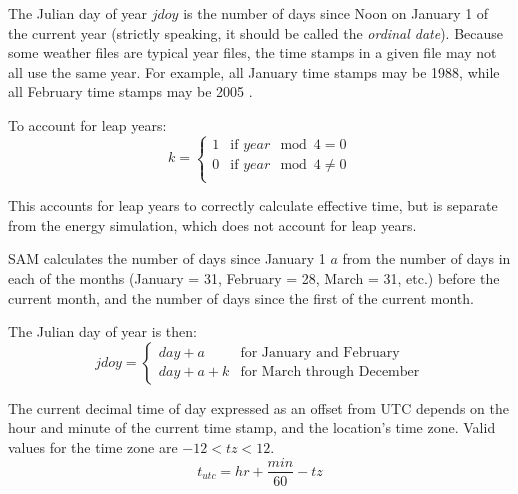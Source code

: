\documentclass[12pt,letterpaper]{article}
\begin{document}
The Julian day of year $\mathit{jdoy}$ is the number of days since Noon on January 1 of the current year (strictly speaking, it should be called the \textit{ordinal date}). Because some weather files are typical year files, the time stamps in a given file may not all use the same year. For example, all January time stamps may be 1988, while all February time stamps may be 2005 \citep{tmy3}.

To account for leap years:
\begin{equation}
k = 
\left\{
   \begin{array}{ll}
      1 & \text{if $\mathit{year}\mod4=0$}\\
      0 & \text{if $\mathit{year}\mod4\neq0$}\\
   \end{array}
\right. 
\end{equation}

This accounts for leap years to correctly calculate effective time, but is separate from the energy simulation, which does not account for leap years.

SAM calculates the number of days since January 1 $a$ from the number of days in each of the months (January = 31, February = 28, March = 31, etc.) before the current month, and the number of days since the first of the current month.

The Julian day of year is then:
\begin{equation}
\mathit{jdoy}= 
\left\{
   \begin{array}{ll}
      \mathit{day} + a & \text{for January and February}\\
      \mathit{day} + a + k & \text{for March through December}
   \end{array}
\right. 
\end{equation}

The current decimal time of day expressed as an offset from UTC depends on the hour and minute of the current time stamp, and the location's time zone. Valid values for the time zone are $-12<\mathit{tz}<12$.
\begin{equation}\label{eqn-tutc}
t_{utc} = \mathit{hr} + \frac{\mathit{min}}{60} - \mathit{tz}
\end{equation}
\end{document}
